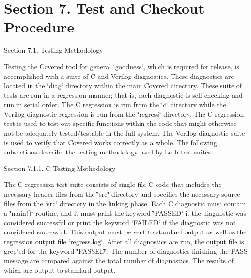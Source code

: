 \section{Section 7.  Test and Checkout Procedure}\label{page_testing}
\begin{Desc}
\item[Section 7.1. Testing Methodology]\end{Desc}
\begin{Desc}
\item[]Testing the Covered tool for general \char`\"{}goodness\char`\"{}, which is required for release, is accomplished with a suite of C and Verilog diagnostics. These diagnostics are located in the \char`\"{}diag\char`\"{} directory within the main Covered directory. These suite of tests are run in a regression manner; that is, each diagnostic is self-checking and run in serial order. The C regression is run from the \char`\"{}c\char`\"{} directory while the Verilog diagnostic regression is run from the \char`\"{}regress\char`\"{} directory. The C regression test is used to test out specific functions within the code that might otherwise not be adequately tested/testable in the full system. The Verilog diagnostic suite is used to verify that Covered works correctly as a whole. The following subsections describe the testing methodology used by both test suites.\end{Desc}
\begin{Desc}
\item[Section 7.1.1. C Testing Methodology]\end{Desc}
\begin{Desc}
\item[]The C regression test suite consists of single file C code that includes the necessary header files from the \char`\"{}src\char`\"{} directory and specifies the necessary source files from the \char`\"{}src\char`\"{} directory in the linking phase. Each C diagnostic must contain a \char`\"{}main()\char`\"{} routine, and it must print the keyword \char`\"{}PASSED\char`\"{} if the diagnostic was considered successful or print the keyword \char`\"{}FAILED\char`\"{} if the diagnostic was not considered successful. This output must be sent to standard output as well as the regression output file \char`\"{}regress.log\char`\"{}. After all diagnostics are run, the output file is grep'ed for the keyword \char`\"{}PASSED\char`\"{}. The number of diagnostics finishing the PASS message are compared against the total number of diagnostics. The results of which are output to standard output.\end{Desc}
